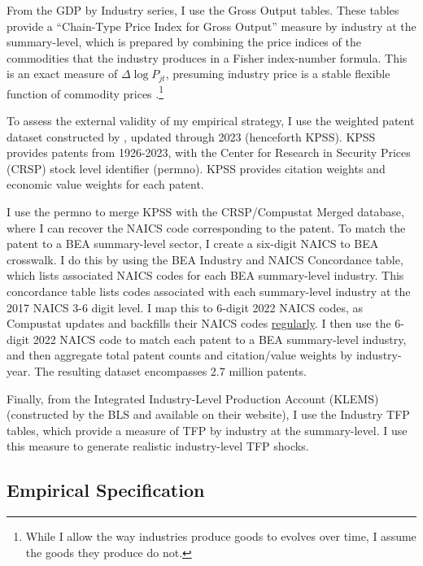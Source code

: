 \documentclass[11pt]{article}
\begin{document}
From the GDP by Industry series, I use the Gross Output tables. These tables provide a ``Chain-Type Price Index for Gross Output'' measure by industry at the summary-level, which is prepared by combining the price indices of the commodities that the industry produces in a Fisher index-number formula. This is an exact measure of $\Delta \log P_{jt}$, presuming industry price is a stable flexible function of commodity prices \citep{diewertExactSuperlativeIndex1976}.\footnote{While I allow the way industries produce goods to evolves over time, I assume the goods they produce do not.}

To assess the external validity of my empirical strategy, I use the weighted patent dataset constructed by \cite{koganTechnologicalInnovationResource2017}, updated through 2023 (henceforth KPSS). KPSS provides patents from 1926-2023, with the Center for Research in Security Prices (CRSP) stock level identifier (permno). KPSS provides citation weights and economic value weights for each patent. 

I use the permno to merge KPSS with the CRSP/Compustat Merged database, where I can recover the NAICS code corresponding to the patent. To match the patent to a BEA summary-level sector, I create a six-digit NAICS to BEA crosswalk. I do this by using the BEA Industry and NAICS Concordance table, which lists associated NAICS codes for each BEA summary-level industry. This concordance table lists codes associated with each summary-level industry at the 2017 NAICS 3-6 digit level. I map this to 6-digit 2022 NAICS codes, as Compustat updates and backfills their NAICS codes \href{https://wrds-www.wharton.upenn.edu/pages/support/support-articles/compustat/general/naics-compustat/#detail}{regularly}. I then use the 6-digit 2022 NAICS code to match each patent to a BEA summary-level industry, and then aggregate total patent counts and citation/value weights by industry-year. The resulting dataset encompasses 2.7 million patents.

Finally, from the Integrated Industry-Level Production Account (KLEMS) (constructed by the BLS and available on their website), I use the Industry TFP tables, which provide a measure of TFP by industry at the summary-level. I use this measure to generate realistic industry-level TFP shocks.

\subsection{Empirical Specification}
\end{document}
